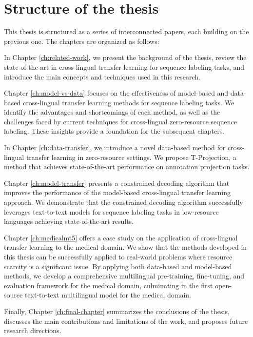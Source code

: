 \section{Structure of the thesis}

This thesis is structured as a series of interconnected papers, each building on the previous one. The chapters are organized as follows:

In Chapter \ref{ch:related-work}, we present the background of the thesis, review the state-of-the-art in cross-lingual transfer learning for sequence labeling tasks, and introduce the main concepts and techniques used in this research.

Chapter \ref{ch:model-vs-data} focuses on the effectiveness of model-based and data-based cross-lingual transfer learning methods for sequence labeling tasks. We identify the advantages and shortcomings of each method, as well as the challenges faced by current techniques for cross-lingual zero-resource sequence labeling. These insights provide a foundation for the subsequent chapters.

In Chapter \ref{ch:data-transfer}, we introduce a novel data-based method for cross-lingual transfer learning in zero-resource settings. We propose T-Projection, a method that achieves state-of-the-art performance on annotation projection tasks.

Chapter \ref{ch:model-transfer} presents a constrained decoding algorithm that improves the performance of the model-based cross-lingual transfer learning approach. We demonstrate that the constrained decoding algorithm successfully leverages text-to-text models for sequence labeling tasks in low-resource languages achieving state-of-the-art results. 

Chapter \ref{ch:medicalmt5} offers a case study on the application of cross-lingual transfer learning to the medical domain. We show that the methods developed in this thesis can be successfully applied to real-world problems where resource scarcity is a significant issue. By applying both data-based and model-based methods, we develop a comprehensive multilingual pre-training, fine-tuning, and evaluation framework for the medical domain, culminating in the first open-source text-to-text multilingual model for the medical domain.

Finally, Chapter \ref{ch:final-chapter} summarizes the conclusions of the thesis, discusses the main contributions and limitations of the work, and proposes future research directions.


